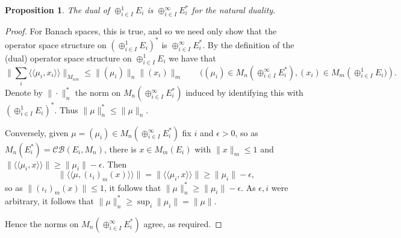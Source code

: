 \documentclass[a4paper,11pt]{article}
\theoremstyle{plain}
\newtheorem{proposition}{Proposition}[section]
\theoremstyle{definition}
\newcommand{\mc}[1]{\mathcal{#1}}
\newcommand{\osip}[2]{\langle\langle{#1},{#2}\rangle\rangle}
\begin{document}
\begin{proposition}
The dual of $\oplus_{i\in I}^1 E_i$ is $\oplus_{i\in I}^\infty E_i^*$ for the natural duality.
\end{proposition}
\begin{proof}
For Banach spaces, this is true, and so we need only show that the operator space structure
on $(\oplus_{i\in I}^1 E_i)^*$ is $\oplus_{i\in I}^\infty E_i^*$.  By the definition of
the (dual) operator space structure on $\oplus_{i\in I}^1 E_i$ we have that
\[ \Big\| \sum_i \osip{\mu_i}{x_i} \Big\|_{M_{nm}}
\leq \|(\mu_i)\|_n \|(x_i)\|_m \qquad \big((\mu_i)\in M_n(\oplus_{i\in I}^\infty E_i^*),
(x_i)\in M_m(\oplus_{i\in I}^1 E_i\big)). \]
Denote by $\|\cdot\|_n^*$ the norm on $M_n(\oplus_{i\in I}^\infty E_i^*)$ induced by
identifying this with $(\oplus_{i\in I}^1 E_i)^*$.  Thus $\|\mu\|_n^* \leq \|\mu\|_n$.

Conversely, given $\mu=(\mu_i) \in M_n(\oplus_{i\in I}^\infty E_i^*)$ fix $i$ and $\epsilon>0$,
so as $M_n(E_i^*) = \mc{CB}(E_i,M_n)$, there is $x\in M_m(E_i)$ with $\|x\|_m\leq 1$ and
$\|\osip{\mu_i}{x}\|\geq \|\mu_i\|-\epsilon$.  Then
\[ \|\osip{\mu}{(\iota_i)_m(x)}\| = \|\osip{\mu_i}{x}\|
\geq \|\mu_i\|-\epsilon, \]
so as $\|(\iota_i)_m(x)\|\leq 1$, it follows that $\|\mu\|_n^* \geq \|\mu_i\|-\epsilon$.
As $\epsilon,i$ were arbitrary, it follows that $\|\mu\|_n^* \geq \sup_i \|\mu_i\|
= \|\mu\|$.

Hence the norms on $M_n(\oplus_{i\in I}^\infty E_i^*)$ agree, as required.
\end{proof}
\end{document}
